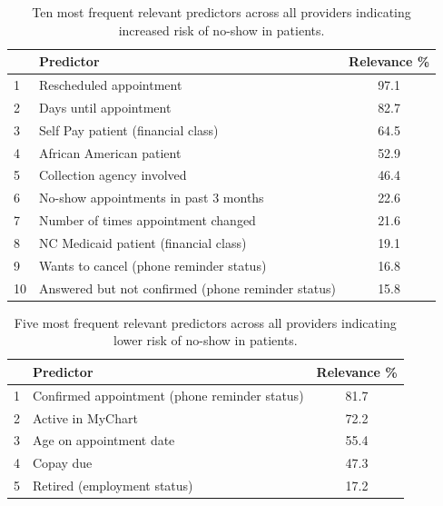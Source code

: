 \documentclass[twoside,11pt]{article}
\begin{document}
\begin{table}[H]
\footnotesize
\centering
\caption{Ten most frequent relevant predictors across all providers indicating increased risk of no-show in patients.} \label{tb:highall}
\begin{tabular}{llc}
  \hline \hline
 & \bf{Predictor} & \bf{Relevance} \% \\ 
  \hline \hline
1 & Rescheduled appointment & 97.1 \\ 
2 & Days until appointment & 82.7 \\
3 & Self Pay patient (financial class)& 64.5 \\ 
4 & African American patient & 52.9 \\ 
5 & Collection agency involved & 46.4 \\ 
6 & No-show appointments in past 3 months & 22.6 \\ 
7 & Number of times appointment changed & 21.6 \\ 
8 & NC Medicaid patient (financial class)& 19.1 \\ 
9 & Wants to cancel (phone reminder status) & 16.8 \\ 
10 & Answered but not confirmed (phone reminder status) & 15.8 \\ 
   \hline
\end{tabular}
\end{table}

\vspace{-0.6cm}

\begin{table}[h]
\footnotesize
\caption{Five most frequent relevant predictors across all providers indicating lower risk of no-show in patients.}  \label{tb:lowall}
\centering
\begin{tabular}{llc}
  \hline \hline
 & \bf{Predictor} & \bf{Relevance \%} \\ 
  \hline \hline
 1 & Confirmed  appointment (phone reminder status) & 81.7 \\ 
 2 & Active in MyChart & 72.2\\ 
 3 & Age on appointment date & 55.4 \\ 
 4 & Copay due & 47.3 \\ 
 5 & Retired (employment status) & 17.2 \\  
   \hline
\end{tabular}
\end{table}
\end{document}
